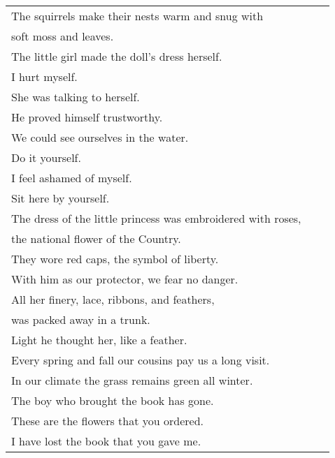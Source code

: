\begin{tabular}{l|l l }
The squirrels make their nests warm and snug with  &\\ \indent soft moss and leaves. & &\\
 
The little girl made the doll's dress herself. & &\\
 
I hurt myself. & &\\
 
She was talking to herself. & &\\
 
He proved himself trustworthy. & &\\
 
We could see ourselves in the water. & &\\
 
Do it yourself. & &\\
 
I feel ashamed of myself. & &\\
 
Sit here by yourself. & &\\
 
The dress of the little princess was embroidered with roses,  &\\ \indent the national flower of the Country. & &\\
 
They wore red caps, the symbol of liberty. & &\\
 
With him as our protector, we fear no danger. & &\\
 
All her finery, lace, ribbons, and feathers,  &\\ \indent  was packed away in a trunk. & &\\
 
Light he thought her, like a feather. & &\\
 
Every spring and fall our cousins pay us a long visit. & &\\
 
In our climate the grass remains green all winter. & &\\
 
The boy who brought the book has gone. & &\\
 
These are the flowers that you ordered. & &\\
 
I have lost the book that you gave me. & &\\
 

\end{tabular}
